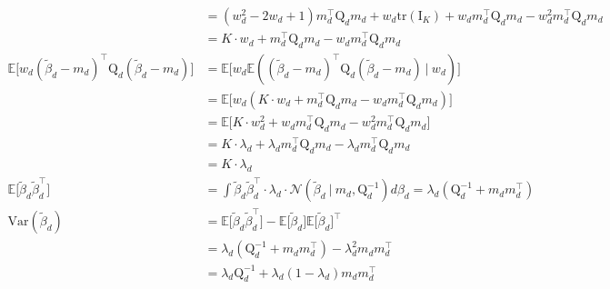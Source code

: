 \documentclass[twoside,11pt]{article}
\newcommand\given[1][]{\:#1\vert\:}
\newcommand{\transpose}[1]{#1^{\intercal}}
\newcommand{\E}{\mathbb{E}}
\newcommand{\betad}{\tilde{\beta}_d}
\newcommand{\qmat}{\mathrm{Q}}
\newcommand{\qbeta}{\mathcal{N} \left( \betad \given m_d, \qmat_d^{-1} \right)}
\newcommand{\trace}[1]{\mathrm{tr} \left( #1 \right)}
\newcommand{\var}[1]{\mathrm{Var}\left(#1\right)}
\begin{document}
\begin{align*}
	&= (w_d^2 - 2w_d + 1)\transpose{m_d} \qmat_d m_d + w_d \trace{\mathrm{I}_K} + w_d\transpose{m_d}\qmat_d m_d -w_d^2\transpose{m_d}\qmat_d m_d \\
	&= K \cdot w_d + \transpose{m_d}\qmat_d m_d - w_d \transpose{m_d}\qmat_d m_d \\
	\E \Big[ w_d \transpose{(\betad - m_d)} \qmat_{d}(\betad - m_d) \Big] &= \E \Big[ w_d \E \left(\transpose{(\betad - m_d)} \qmat_{d}(\betad - m_d) \given w_d \right) \Big]\\
	&= \E \Big[ w_d \left( K \cdot w_d + \transpose{m_d}\qmat_d m_d - w_d \transpose{m_d}\qmat_d m_d\right) \Big] \\
	&= \E \Big[ K \cdot w_d^2 + w_d \transpose{m_d}\qmat_d m_d - w_d^2 \transpose{m_d}\qmat_d m_d \Big] \\
	&= K \cdot \lambda_d + \lambda_d \transpose{m_d}\qmat_d m_d - \lambda_d \transpose{m_d}\qmat_d m_d \\
	&= K \cdot \lambda_d \\
	\E \Big[ \betad \transpose{\betad} \Big] &= \int \betad \transpose{\betad} \cdot  \lambda_d \cdot 
\qbeta d\beta_d = \lambda_d \left( \qmat_d^{-1} + m_d \transpose{m_d} \right) \\
	\var{\betad} &= \E \Big[ \betad \transpose{\betad} \Big] - \E \Big[ \betad\Big] \transpose{\E \Big[ \betad\Big]} \\
	&= \lambda_d \left( \qmat_d^{-1} + m_d \transpose{m_d} \right) - \lambda_d^2 m_d \transpose{m_d} \\
	&= \lambda_d \qmat_d^{-1} + \lambda_d(1 - \lambda_d) m_d \transpose{m_d}
\end{align*}




\vskip 0.2in
\printbibliography
\end{document}
